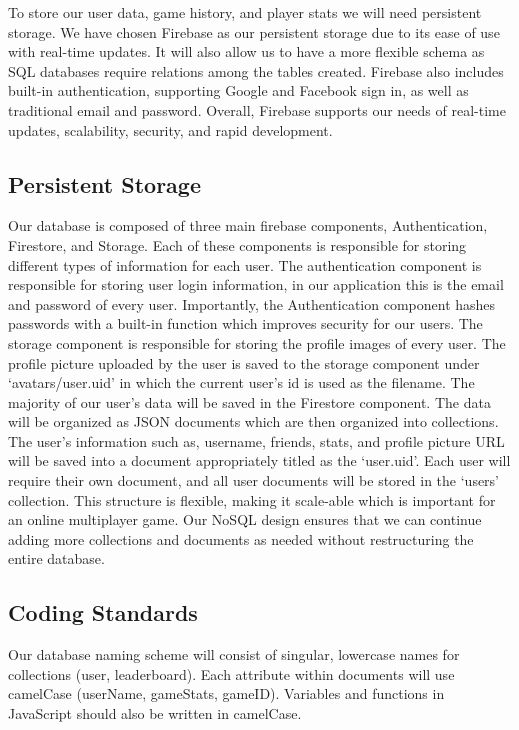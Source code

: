 To store our user data, game history, and player stats we will need persistent storage. We have chosen Firebase as our persistent storage due to its ease of use with real-time updates. It will also allow us to have a more flexible schema as SQL databases require relations among the tables created. Firebase also includes built-in authentication, supporting Google and Facebook sign in, as well as traditional email and password. Overall, Firebase supports our needs of real-time updates, scalability, security, and rapid development. 

\subsection{Persistent Storage}
Our database is composed of three main firebase components, Authentication, Firestore, and Storage. Each of these components is responsible for storing different types of information for each user. The authentication component is responsible for storing user login information, in our application this is the email and password of every user. Importantly, the Authentication component hashes passwords with a built-in function which improves security for our users. The storage component is responsible for storing the profile images of every user. The profile picture uploaded by the user is saved to the storage component under `avatars/user.uid' in which the current user's id is used as the filename. The majority of our user's data will be saved in the Firestore component. The data will be organized as JSON documents which are then organized into collections. The user's information such as, username, friends, stats, and profile picture URL will be saved into a document appropriately titled as the `user.uid'. Each user will require their own document, and all user documents will be stored in the `users' collection. This structure is flexible, making it scale-able which is important for an online multiplayer game. Our NoSQL design ensures that we can continue adding more collections and documents as needed without restructuring the entire database.

\subsection{Coding Standards}
Our database naming scheme will consist of singular, lowercase names for collections (user, leaderboard). Each attribute within documents will use camelCase (userName, gameStats, gameID). Variables and functions in JavaScript should also be written in camelCase. 

